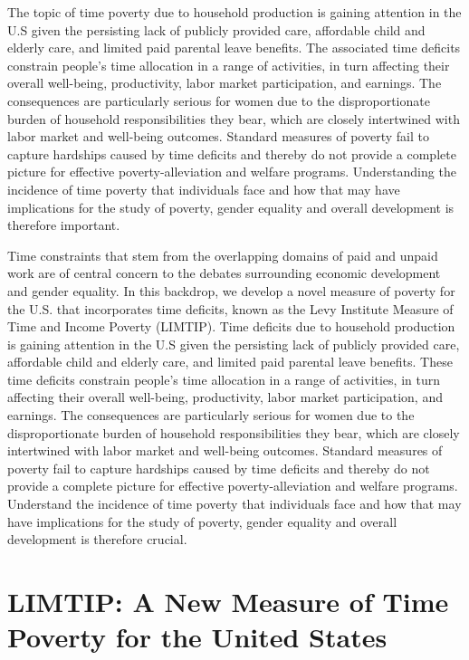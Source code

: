 \documentclass[
  11pt,
]{article}
\begin{document}
The topic of time poverty due to household production is gaining
attention in the U.S given the persisting lack of publicly provided
care, affordable child and elderly care, and limited paid parental leave
benefits. The associated time deficits constrain people's time
allocation in a range of activities, in turn affecting their overall
well-being, productivity, labor market participation, and earnings. The
consequences are particularly serious for women due to the
disproportionate burden of household responsibilities they bear, which
are closely intertwined with labor market and well-being outcomes.
Standard measures of poverty fail to capture hardships caused by time
deficits and thereby do not provide a complete picture for effective
poverty-alleviation and welfare programs. Understanding the incidence of
time poverty that individuals face and how that may have implications
for the study of poverty, gender equality and overall development is
therefore important.

Time constraints that stem from the overlapping domains of paid and
unpaid work are of central concern to the debates surrounding economic
development and gender equality. In this backdrop, we develop a novel
measure of poverty for the U.S. that incorporates time deficits, known
as the Levy Institute Measure of Time and Income Poverty (LIMTIP). Time
deficits due to household production is gaining attention in the U.S
given the persisting lack of publicly provided care, affordable child
and elderly care, and limited paid parental leave benefits. These time
deficits constrain people's time allocation in a range of activities, in
turn affecting their overall well-being, productivity, labor market
participation, and earnings. The consequences are particularly serious
for women due to the disproportionate burden of household
responsibilities they bear, which are closely intertwined with labor
market and well-being outcomes. Standard measures of poverty fail to
capture hardships caused by time deficits and thereby do not provide a
complete picture for effective poverty-alleviation and welfare programs.
Understand the incidence of time poverty that individuals face and how
that may have implications for the study of poverty, gender equality and
overall development is therefore crucial.

\section{LIMTIP: A New Measure of Time Poverty for the United
States}\label{limtip-a-new-measure-of-time-poverty-for-the-united-states}
\end{document}
